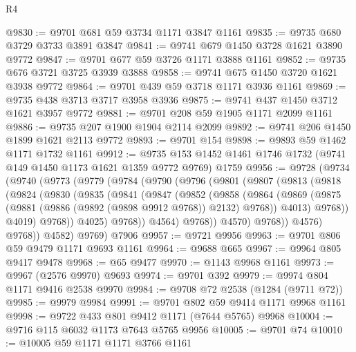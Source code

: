 \begin{lexlean}{R4}
\begin{coremodule}
@9830 := @9701 @681 @59 @3734 @1171 @3847 @1161
@9835 := @9735 @680 @3729 @3733 @3891 @3847
@9841 := @9741 @679 @1450 @3728 @1621 @3890 @9772
@9847 := @9701 @677 @59 @3726 @1171 @3888 @1161
@9852 := @9735 @676 @3721 @3725 @3939 @3888
@9858 := @9741 @675 @1450 @3720 @1621 @3938 @9772
@9864 := @9701 @439 @59 @3718 @1171 @3936 @1161
@9869 := @9735 @438 @3713 @3717 @3958 @3936
@9875 := @9741 @437 @1450 @3712 @1621 @3957 @9772
@9881 := @9701 @208 @59 @1905 @1171 @2099 @1161
@9886 := @9735 @207 @1900 @1904 @2114 @2099
@9892 := @9741 @206 @1450 @1899 @1621 @2113 @9772
@9893 := @9701 @154
@9898 := @9893 @59 @1462 @1171 @1732 @1161
@9912 := @9735 @153 @1452 @1461 @1746 @1732 (@9741 @149 @1450 @1173 @1621 @1359 @9772 @9769) @1759
@9956 := @9728
    (@9734
      (@9740
        (@9773
          (@9779
            (@9784
              (@9790
                (@9796
                  (@9801
                    (@9807
                      (@9813
                        (@9818
                          (@9824
                            (@9830
                              (@9835
                                (@9841
                                  (@9847
                                    (@9852
                                      (@9858
                                        (@9864
                                          (@9869
                                            (@9875
                                              (@9881
                                                (@9886 (@9892 (@9898 @9912 @9768)) @2132)
                                                @9768))
                                            @4013)
                                          @9768))
                                      @4019)
                                    @9768))
                                @4025)
                              @9768))
                          @4564)
                        @9768))
                    @4570)
                  @9768))
              @4576)
            @9768))
        @4582)
      @9769)
    @7906
@9957 := @9721 @9956
@9963 := @9701 @806 @59 @9479 @1171 @9693 @1161
@9964 := @9688 @665
@9967 := @9964 @805 @9417 @9478
@9968 := @65 @9477
@9970 := @1143 @9968 @1161
@9973 := @9967 (@2576 @9970) @9693
@9974 := @9701 @392
@9979 := @9974 @804 @1171 @9416 @2538 @9970
@9984 := @9708 @72 @2538 (@1284 (@9711 @72))
@9985 := @9979 @9984
@9991 := @9701 @802 @59 @9414 @1171 @9968 @1161
@9998 := @9722 @433 @801 @9412 @1171 (@7644 @5765) @9968
@10004 := @9716 @115 @6032 @1173 @7643 @5765 @9956
@10005 := @9701 @74
@10010 := @10005 @59 @1171 @1171 @3766 @1161

\end{coremodule}
\end{lexlean}
